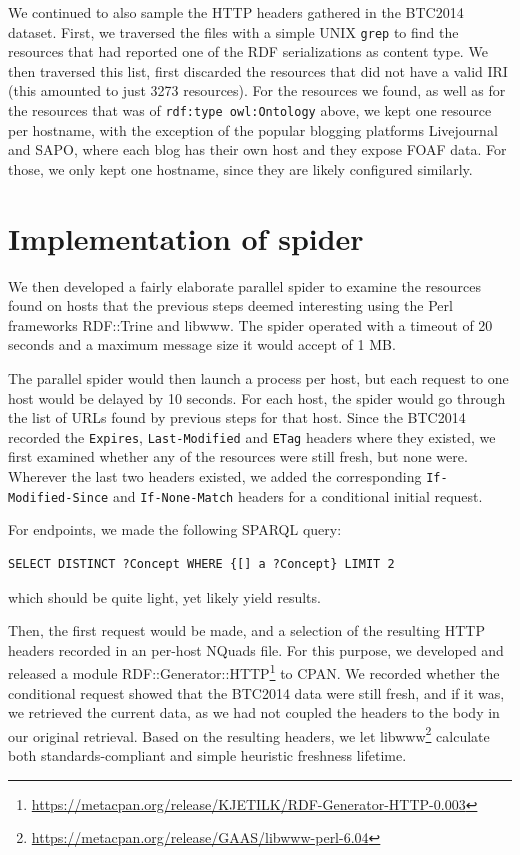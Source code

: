 \documentclass[a4paper,english]{article}
\newcommand{\rdfterm}[1]{\texttt{#1}}
\newcommand{\httph}[1]{\texttt{#1}}
\begin{document}
We continued to also sample the HTTP headers gathered in the BTC2014
dataset. 
First, we traversed the files with a simple UNIX \texttt{grep} to find
the resources that had reported one of the RDF serializations as
content type. We then traversed this list, first discarded the
resources that did not have a valid IRI (this amounted to just 3273
resources). For the resources we found, as well as for the resources
that was of \rdfterm{rdf:type owl:Ontology} above, we kept one
resource per hostname, with the exception of the popular blogging
platforms Livejournal and SAPO, where each blog has their own host and
they expose FOAF data. For those, we only kept one hostname, since
they are likely configured similarly. 

\section{Implementation of spider}\label{app:fetcher}

We then developed a fairly elaborate parallel spider to examine the
resources found on hosts that the previous steps deemed interesting
using the Perl frameworks RDF::Trine and libwww. The spider operated
with a timeout of 20 seconds and a maximum message size it would
accept of 1 MB.

The parallel spider would then launch a process per host, but each
request to one host would be delayed by 10 seconds. For each host, the
spider would go through the list of URLs found by previous steps for
that host. Since the BTC2014 recorded the \httph{Expires},
\httph{Last-Modified} and \httph{ETag} headers where they existed, we
first examined whether any of the resources were still fresh, but none
were. Wherever the last two headers existed, we added the
corresponding \httph{If-Modified-Since} and \httph{If-None-Match}
headers for a conditional initial request.

For endpoints, we made the following SPARQL query:
\begin{verbatim}
SELECT DISTINCT ?Concept WHERE {[] a ?Concept} LIMIT 2
\end{verbatim}
which should be quite light, yet likely yield results.

Then, the first request would be made, and a selection of the
resulting HTTP headers recorded in an per-host NQuads file. For this
purpose, we developed and released a module
RDF::Generator::HTTP\footnote{\url{https://metacpan.org/release/KJETILK/RDF-Generator-HTTP-0.003}}
to CPAN. We recorded whether the conditional request showed that the
BTC2014 data were still fresh, and if it was, we retrieved the current
data, as we had not coupled the headers to the body in our original
retrieval.  Based on the resulting headers, we let
libwww\footnote{\url{https://metacpan.org/release/GAAS/libwww-perl-6.04}}
calculate both standards-compliant and simple heuristic freshness
lifetime.
\end{document}
